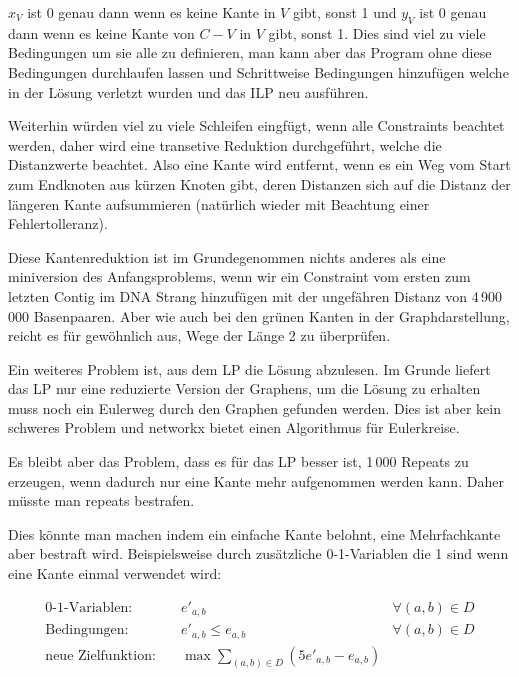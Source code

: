 $x_V$ ist 0 genau dann wenn es keine Kante in $V$ gibt, sonst 1 und $y_V$ ist 0 genau dann wenn es keine Kante von $C-V$ in $V$ gibt, sonst 1.
Dies sind viel zu viele Bedingungen um sie alle zu definieren, man kann aber das Program ohne diese Bedingungen durchlaufen lassen und Schrittweise Bedingungen hinzufügen welche in der Lösung verletzt wurden und das ILP neu ausführen.

Weiterhin würden viel zu viele Schleifen eingfügt, wenn alle Constraints beachtet werden, daher wird eine transetive Reduktion durchgeführt, welche die Distanzwerte beachtet. Also eine Kante wird entfernt, wenn es ein Weg vom Start zum Endknoten aus kürzen Knoten gibt, deren Distanzen sich auf die Distanz der längeren Kante aufsummieren (natürlich wieder mit Beachtung einer Fehlertolleranz).

Diese Kantenreduktion ist im Grundegenommen nichts anderes als eine miniversion des Anfangsproblems, wenn wir ein Constraint vom ersten zum letzten Contig im DNA Strang hinzufügen mit der ungefähren Distanz von 4\,900\,000 Basenpaaren. Aber wie auch bei den grünen Kanten in der Graphdarstellung, reicht es für gewöhnlich aus, Wege der Länge 2 zu überprüfen.

Ein weiteres Problem ist, aus dem LP die Lösung abzulesen. Im Grunde liefert das LP nur eine reduzierte Version der Graphens, um die Lösung zu erhalten muss noch ein Eulerweg durch den Graphen gefunden werden. Dies ist aber kein schweres Problem und networkx bietet einen Algorithmus für Eulerkreise.

Es bleibt aber das Problem, dass es für das LP besser ist, 1\,000 Repeats zu erzeugen, wenn dadurch nur eine Kante mehr aufgenommen werden kann. Daher müsste man repeats bestrafen. 

Dies könnte man machen indem ein einfache Kante belohnt, eine Mehrfachkante aber bestraft wird. Beispielsweise durch zusätzliche 0-1-Variablen die 1 sind wenn eine Kante einmal verwendet wird:

\begin{align*}
\text{0-1-Variablen:}\quad& e'_{a,b} &\forall (a,b) \in D\\
\text{Bedingungen:}\quad& e'_{a,b} \leq e_{a,b}&\forall (a,b) \in D\\
\text{neue Zielfunktion:}\quad& \max \sum_{(a,b) \in D} (5 e'_{a,b} - e_{a,b})
\end{align*}
\clearpage
%
%
%
\printbibliography[heading=bibintoc, title=References]
\clearpage
\listoffigures
\listoftables
